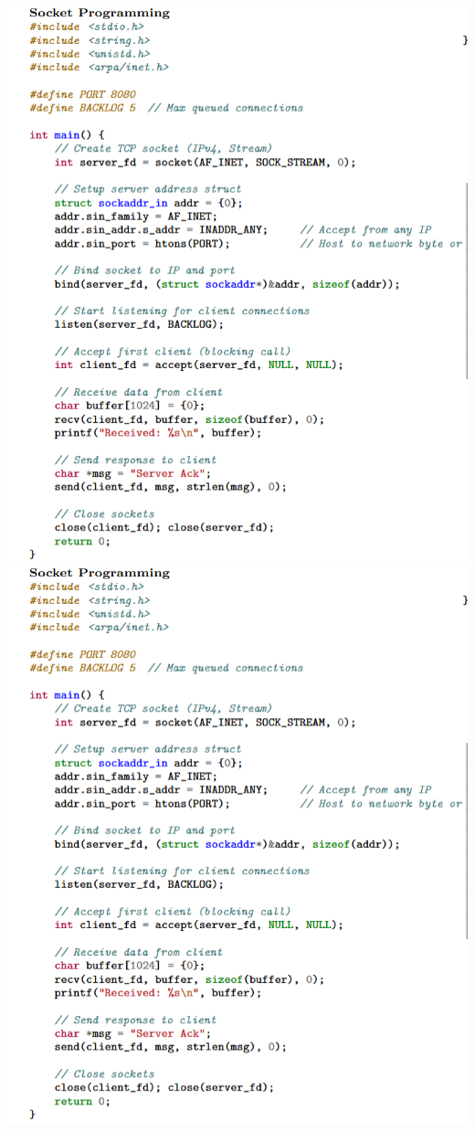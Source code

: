 \documentclass[letterpaper, 8pt]{extarticle}
\begin{document}
\begin{multicols*}{4}
	\includegraphics[width=\linewidth]{0425AF17-A743-4266-9F7D-50D8C3335FD6.png}
	\includegraphics[width=\linewidth]{0425AF17-A743-4266-9F7D-50D8C3335FD6.png}


\end{multicols*}
\end{document}
